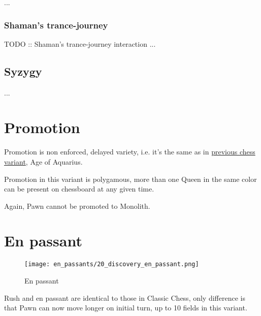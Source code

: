 ...

\clearpage %

\subsubsection*{Shaman's trance-journey}

\huge{TODO :: Shaman's trance-journey interaction}
\normalsize{}
...

\clearpage %

\subsection*{Syzygy}
...

\clearpage %

\section*{Promotion}

Promotion is non enforced, delayed variety, i.e. it's the same as in
\hyperref[sec:Age of Aquarius/Promotion]{previous chess variant}, Age of Aquarius.

Promotion in this variant is polygamous, more than one Queen in the same color
can be present on chessboard at any given time.

Again, Pawn cannot be promoted to Monolith.

\clearpage %

\section*{En passant}

\noindent
\begin{wrapfigure}{l}{0.4\textwidth}
\centering
\texttt{[image: en\_passants/20\_discovery\_en\_passant.png]}
\caption{En passant}
\label{fig:20_discovery_en_passant}
\end{wrapfigure}
Rush and en passant are identical to those in Classic Chess, only difference
is that Pawn can now move longer on initial turn, up to 10 fields in this
variant.


